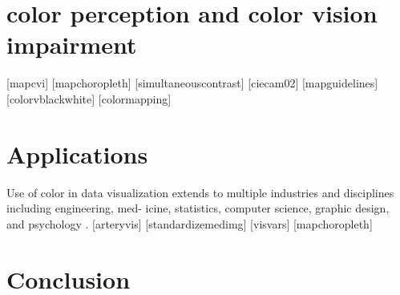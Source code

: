 \documentclass[journal]{IEEEtran}
\begin{document}
\section{color perception and color vision impairment}

[mapcvi]
[mapchoropleth]
[simultaneouscontrast]
[ciecam02]
[mapguidelines]
[colorvblackwhite]
[colormapping]

\section{Applications}
Use of color in data visualization extends to multiple
industries and disciplines including engineering, med-
icine, statistics, computer science, graphic design, and
psychology \cite{colorguidelines}.
[arteryvis]
[standardizemedimg]
[visvars]
[mapchoropleth]

\section{Conclusion}
\blindtext[1]

\ifCLASSOPTIONcaptionsoff
  \newpage
\fi




%



\end{document}
